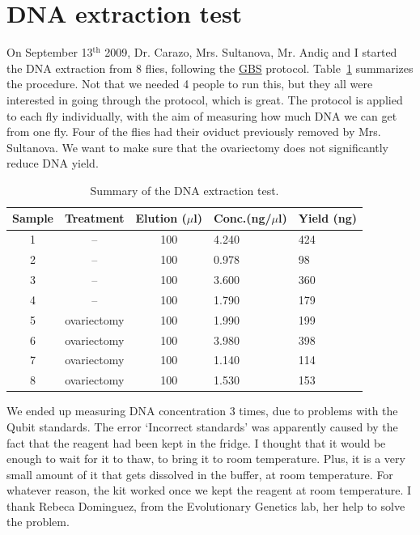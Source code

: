 \documentclass[a4paper,12pt]{article}
\begin{document}
\section{DNA extraction test}
On September 13$^\mathrm{th}$ 2009, Dr. Carazo, Mrs. Sultanova, Mr. Andiç and I started the DNA extraction from 8 flies, following the \href{https://github.com/IgnasiLucas/fly/blob/master/doc/gbs.pdf}{GBS} protocol. Table~\ref{tab:flies} summarizes the procedure. Not that we needed 4 people to run this, but they all were interested in going through the protocol, which is great. The protocol is applied to each fly individually, with the aim of measuring how much DNA we can get from one fly. Four of the flies had their oviduct previously removed by Mrs. Sultanova. We want to make sure that the ovariectomy does not significantly reduce DNA yield.

\begin{table}
\begin{center}
\caption{Summary of the DNA extraction test.}\label{tab:flies}
\vspace*{0.3cm}
\begin{tabular}{cccll}
\toprule
Sample&Treatment&Elution ($\mu$l)&Conc.(ng/$\mu$l)&Yield (ng)\\
\midrule
1&--&100&4.240&424\\
2&--&100&0.978&98\\
3&--&100&3.600&360\\
4&--&100&1.790&179\\
5&ovariectomy&100&1.990&199\\
6&ovariectomy&100&3.980&398\\
7&ovariectomy&100&1.140&114\\
8&ovariectomy&100&1.530&153\\
\bottomrule
\end{tabular}
\end{center}
\end{table}

We ended up measuring DNA concentration 3 times, due to problems with the Qubit standards. The error `Incorrect standards' was apparently caused by the fact that the reagent had been kept in the fridge. I thought that it would be enough to wait for it to thaw, to bring it to room temperature. Plus, it is a very small amount of it that gets dissolved in the buffer, at room temperature. For whatever reason, the kit worked once we kept the reagent at room temperature. I thank Rebeca Dominguez, from the Evolutionary Genetics lab, her help to solve the problem.
\end{document}
